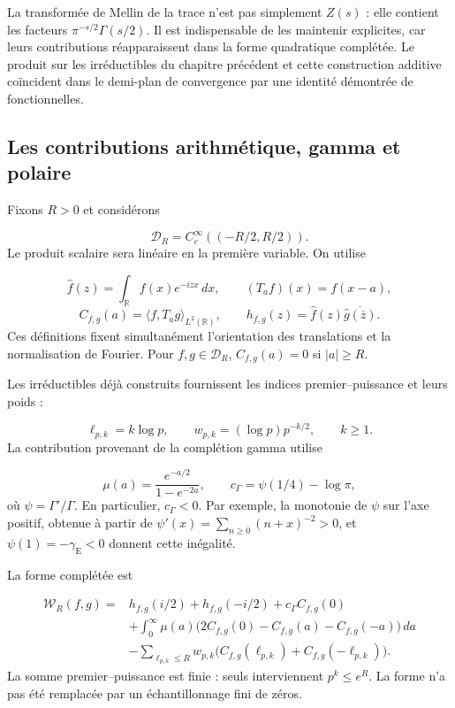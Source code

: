 La transformée de Mellin de la trace n'est pas simplement \(Z(s)\) : elle contient les facteurs \(\pi^{-s/2}\Gamma(s/2)\). Il est indispensable de les maintenir explicites, car leurs contributions réapparaissent dans la forme quadratique complétée. Le produit sur les irréductibles du chapitre précédent et cette construction additive coïncident dans le demi-plan de convergence par une identité démontrée de fonctionnelles.

\subsection{Les contributions arithmétique, gamma et polaire}
\label{viii:rz:forma}
Fixons \(R>0\) et considérons

\[
\mathcal D_R=C_c^\infty((-R/2,R/2)).
\]
Le produit scalaire sera linéaire en la première variable. On utilise

\[
\widehat f(z)=\int_{\mathbb R}f(x)e^{-izx}\,dx,\qquad
(T_af)(x)=f(x-a),
\]
\[
C_{f,g}(a)=\langle f,T_ag\rangle_{L^2(\mathbb R)},\qquad
h_{f,g}(z)=\widehat f(z)\overline{\widehat g(\overline z)}.
\]
Ces définitions fixent simultanément l'orientation des translations et la normalisation de Fourier. Pour \(f,g\in\mathcal D_R\), \(C_{f,g}(a)=0\) si \(|a|\geq R\).

Les irréductibles déjà construits fournissent les indices premier–puissance et leurs poids :

\[
\ell_{p,k}=k\log p,\qquad
w_{p,k}=(\log p)p^{-k/2},\qquad k\geq1.
\]
La contribution provenant de la complétion gamma utilise

\[
\mu(a)=\frac{e^{-a/2}}{1-e^{-2a}},\qquad
c_\Gamma=\psi(1/4)-\log\pi,
\]
où \(\psi=\Gamma'/\Gamma\). En particulier, \(c_\Gamma<0\). Par exemple, la monotonie de \(\psi\) sur l’axe positif, obtenue à partir de \(\psi'(x)=\sum_{n\geq0}(n+x)^{-2}>0\), et \(\psi(1)=-\gamma_{\mathrm E}<0\) donnent cette inégalité.

La forme complétée est

\[
\begin{aligned}
\mathscr W_R(f,g)={}&h_{f,g}(i/2)+h_{f,g}(-i/2)
+c_\Gamma C_{f,g}(0)\\
&+\int_0^\infty\mu(a)
\bigl(2C_{f,g}(0)-C_{f,g}(a)-C_{f,g}(-a)\bigr)\,da\\
&-\sum_{\ell_{p,k}\leq R}w_{p,k}
\bigl(C_{f,g}(\ell_{p,k})+C_{f,g}(-\ell_{p,k})\bigr).
\end{aligned}
\]
La somme premier–puissance est finie : seuls interviennent \(p^k\leq e^R\). La forme n'a pas été remplacée par un échantillonnage fini de zéros.

